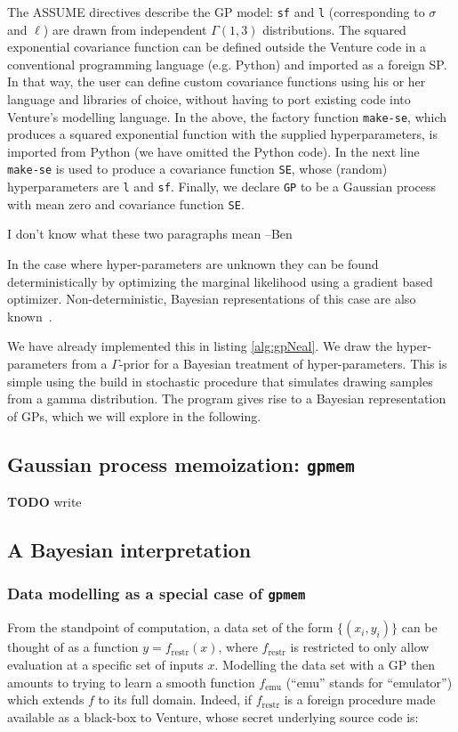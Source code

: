 \documentclass{article} %
\newcommand{\gpmem}{\texttt{gpmem}}
\newcommand{\emu}{{\textrm{emu}}}
\newcommand{\restr}{{\textrm{restr}}}
\begin{document}
The ASSUME directives describe the GP model: \texttt{sf} and \texttt{l} (corresponding to $\sigma$ and $\ell$) are drawn from independent $\Gamma(1,3)$ distributions.
The squared exponential covariance function can be defined outside the Venture code in a conventional programming language (e.g. Python) and imported as a foreign SP.
In that way, the user can define custom covariance functions using his or her language and libraries of choice, without having to port existing code into Venture's modelling language.
In the above, the factory function \texttt{make-se}, which produces a squared exponential function with the supplied hyperparameters, is imported from Python (we have omitted the Python code).
In the next line \texttt{make-se} is used to produce a covariance function \texttt{SE}, whose (random) hyperparameters are \texttt{l} and \texttt{sf}.
Finally, we declare \texttt{GP} to be a Gaussian process with mean zero and covariance function \texttt{SE}.





{\color{red} I don't know what these two paragraphs mean --Ben}

In the case where hyper-parameters are unknown they can be found deterministically by optimizing the marginal likelihood using a gradient based optimizer. Non-deterministic, Bayesian representations of this case are also known~\citep{neal1997monte}. 

We have already implemented this in listing \ref{alg:gpNeal}. We draw the hyper-parameters from a $\Gamma$-prior for a Bayesian treatment of hyper-parameters. This is simple using the build in stochastic procedure that simulates drawing samples from a gamma distribution.
The program gives rise to a Bayesian representation of GPs, which we will explore in the following.

\subsection{Gaussian process memoization: \gpmem}
{\bf TODO} write

\subsection{A Bayesian interpretation}


\subsubsection{Data modelling as a special case of \gpmem}\label{sec:special-case-gpmem}
From the standpoint of computation, a data set of the form $\{(x_i, y_i)\}$ can be thought of as a function $y = f_\restr(x)$, where $f_\restr$ is restricted to only allow evaluation at a specific set of inputs $x$.
Modelling the data set with a GP then amounts to trying to learn a smooth function $f_\emu$ (``emu'' stands for ``emulator'') which extends $f$ to its full domain.
Indeed, if $f_\restr$ is a foreign procedure made available as a black-box to Venture, whose secret underlying source code is:
\end{document}
